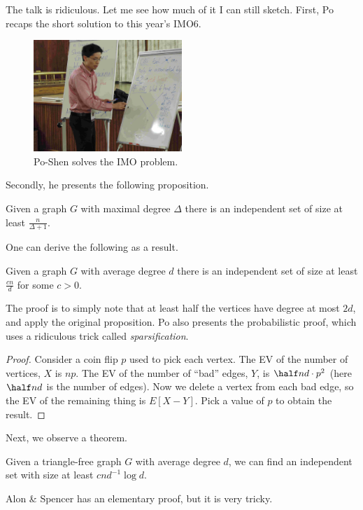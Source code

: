 \documentclass[11pt]{scrreprt}
\numberwithin{figure}{chapter}
\begin{document}
The talk is ridiculous.
Let me see how much of it I can still sketch.
First, Po recaps the short solution to this year's IMO6.

\begin{figure}[ht]
  \centering
  \includegraphics[width=0.5\textwidth]{media/po.jpg}
  \caption{Po-Shen solves the IMO problem.}
\end{figure}

Secondly, he presents the following proposition.
\begin{proposition*}
  Given a graph $G$ with maximal degree $\Delta$ there is an independent set of size at least $\frac{n}{\Delta + 1}$.
\end{proposition*}
One can derive the following as a result.
\begin{proposition*}
  Given a graph $G$ with average degree $d$ there is an independent set of size at least $\frac{cn}{d}$ for some $c > 0$.
\end{proposition*}
The proof is to simply note that at least half the vertices have degree at most $2d$, and apply the original proposition.
Po also presents the probabilistic proof, which uses a ridiculous trick called \emph{sparsification}.
\begin{proof}
  Consider a coin flip $p$ used to pick each vertex.
  The EV of the number of vertices, $X$ is $np$.
  The EV of the number of ``bad'' edges, $Y$, is $\half nd \cdot p^2$ (here $\half nd$ is the number of edges).
  Now we delete a vertex from each bad edge, so the EV of the remaining thing is $E[X-Y]$.
  Pick a value of $p$ to obtain the result.
\end{proof}

Next, we observe a theorem.
\begin{theorem*}
  Given a triangle-free graph $G$ with average degree $d$, we can find an independent set with size at least $cnd^{-1} \log d$.
\end{theorem*}
Alon \& Spencer has an elementary proof, but it is very tricky.
\end{document}
